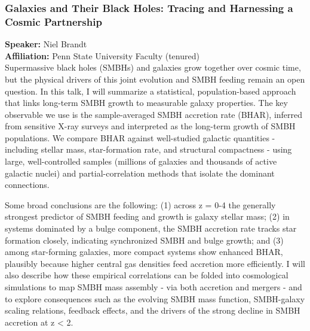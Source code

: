 \hypertarget{abs-30}{}
\subsubsection*{Galaxies and Their Black Holes: Tracing and Harnessing a Cosmic Partnership}
\textbf{Speaker:} Niel Brandt \\
\textbf{Affiliation:} Penn State University \textperiodcentered{} Faculty (tenured)\\
Supermassive black holes (SMBHs) and galaxies grow together over cosmic time, but the physical drivers of this joint evolution and SMBH feeding remain an open question. In this talk, I will summarize a statistical, population-based approach that links long-term SMBH growth to measurable galaxy properties. The key observable we use is the sample-averaged SMBH accretion rate (BHAR), inferred from sensitive X-ray surveys and interpreted as the long-term growth of SMBH populations. We compare BHAR against well-studied galactic quantities - including stellar mass, star-formation rate, and structural compactness - using large, well-controlled samples (millions of galaxies and thousands of active galactic nuclei) and partial-correlation methods that isolate the dominant connections.

Some broad conclusions are the following: (1) across z = 0-4 the generally strongest predictor of SMBH feeding and growth is galaxy stellar mass; (2) in systems dominated by a bulge component, the SMBH accretion rate tracks star formation closely, indicating synchronized SMBH and bulge growth; and (3) among star-forming galaxies, more compact systems show enhanced BHAR, plausibly because higher central gas densities feed accretion more efficiently. I will also describe how these empirical correlations can be folded into cosmological simulations to map SMBH mass assembly - via both accretion and mergers - and to explore consequences such as the evolving SMBH mass function, SMBH-galaxy scaling relations, feedback effects, and the drivers of the strong decline in SMBH accretion at z < 2.

\hypertarget{abs-31}{}
